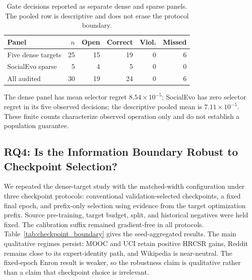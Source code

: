 \documentclass[journal]{IEEEtran}
\begin{document}
\begin{table}[t]
\centering
\caption{Gate decisions reported as separate dense and sparse panels. The pooled row is descriptive and does not erase the protocol boundary.}
\label{tab:gate_panels}
\small
\begin{tabular}{lrrrrr}
\toprule
\textbf{Panel} & $n$ & \textbf{Open} & \textbf{Correct} & \textbf{Viol.} & \textbf{Missed} \\
\midrule
Five dense targets & 25 & 15 & 19 & 0 & 6 \\
SocialEvo sparse & 5 & 4 & 5 & 0 & 0 \\
All audited & 30 & 19 & 24 & 0 & 6 \\
\bottomrule
\end{tabular}
\end{table}
The dense panel has mean selector regret $8.54\!\times\!10^{-5}$; SocialEvo has zero selector regret in its five observed decisions; the descriptive pooled mean is $7.11\!\times\!10^{-5}$. These finite counts characterize observed operation only and do not establish a population guarantee.

\subsection{RQ4: Is the Information Boundary Robust to Checkpoint Selection?}
We repeated the dense-target study with the matched-width configuration under three checkpoint protocols: conventional validation-selected checkpoints, a fixed final epoch, and prefix-only selection using evidence from the target optimization prefix. Source pre-training, target budget, split, and historical negatives were held fixed. The calibration suffix remained gradient-free in all protocols. Table~\ref{tab:checkpoint_boundary} gives the seed-aggregated results. The main qualitative regimes persist: MOOC and UCI retain positive HRCSR gains, Reddit remains close to its expert-identity path, and Wikipedia is near-neutral. The fixed-epoch Enron result is weaker, so the robustness claim is qualitative rather than a claim that checkpoint choice is irrelevant.
\end{document}
